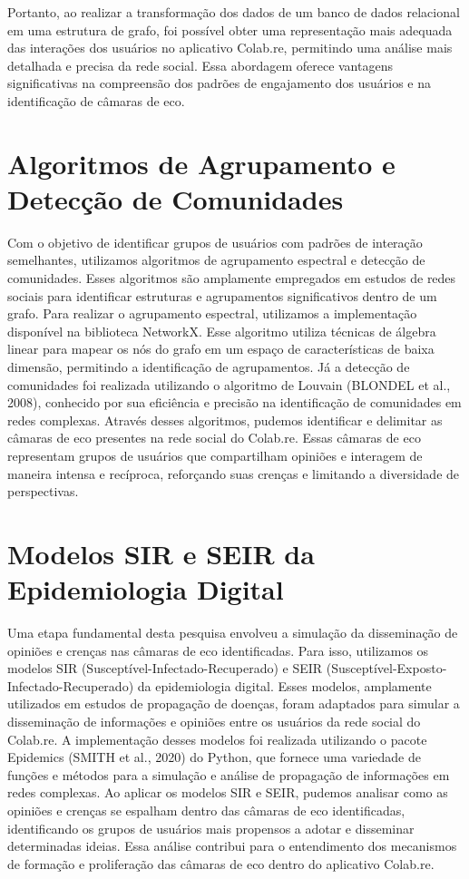 Portanto, ao realizar a transformação dos dados de um banco de dados relacional em uma estrutura de grafo, foi possível obter uma representação mais adequada das interações dos usuários no aplicativo Colab.re, permitindo uma análise mais detalhada e precisa da rede social. Essa abordagem oferece vantagens significativas na compreensão dos padrões de engajamento dos usuários e na identificação de câmaras de eco.

\section{Algoritmos de Agrupamento e Detecção de Comunidades}
Com o objetivo de identificar grupos de usuários com padrões de interação semelhantes, utilizamos algoritmos de agrupamento espectral e detecção de comunidades. Esses algoritmos são amplamente empregados em estudos de redes sociais para identificar estruturas e agrupamentos significativos dentro de um grafo.
Para realizar o agrupamento espectral, utilizamos a implementação disponível na biblioteca NetworkX. Esse algoritmo utiliza técnicas de álgebra linear para mapear os nós do grafo em um espaço de características de baixa dimensão, permitindo a identificação de agrupamentos. Já a detecção de comunidades foi realizada utilizando o algoritmo de Louvain (BLONDEL et al., 2008), conhecido por sua eficiência e precisão na identificação de comunidades em redes complexas.
Através desses algoritmos, pudemos identificar e delimitar as câmaras de eco presentes na rede social do Colab.re. Essas câmaras de eco representam grupos de usuários que compartilham opiniões e interagem de maneira intensa e recíproca, reforçando suas crenças e limitando a diversidade de perspectivas.

\section{Modelos SIR e SEIR da Epidemiologia Digital}
Uma etapa fundamental desta pesquisa envolveu a simulação da disseminação de opiniões e crenças nas câmaras de eco identificadas. Para isso, utilizamos os modelos SIR (Susceptível-Infectado-Recuperado) e SEIR (Susceptível-Exposto-Infectado-Recuperado) da epidemiologia digital.
Esses modelos, amplamente utilizados em estudos de propagação de doenças, foram adaptados para simular a disseminação de informações e opiniões entre os usuários da rede social do Colab.re. A implementação desses modelos foi realizada utilizando o pacote Epidemics (SMITH et al., 2020) do Python, que fornece uma variedade de funções e métodos para a simulação e análise de propagação de informações em redes complexas.
Ao aplicar os modelos SIR e SEIR, pudemos analisar como as opiniões e crenças se espalham dentro das câmaras de eco identificadas, identificando os grupos de usuários mais propensos a adotar e disseminar determinadas ideias. Essa análise contribui para o entendimento dos mecanismos de formação e proliferação das câmaras de eco dentro do aplicativo Colab.re.

